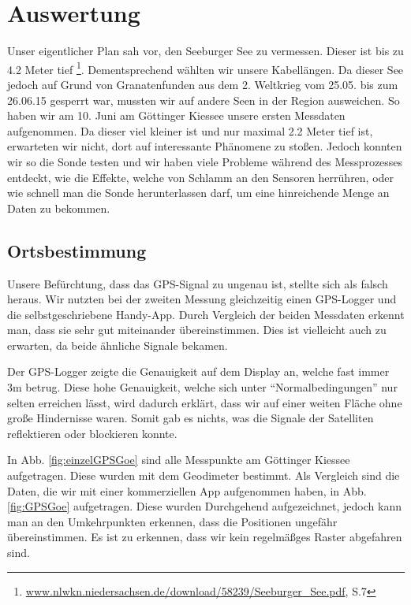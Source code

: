 \documentclass[12pt,a4paper,titlepage,headinclude,bibtotoc]{scrartcl}
\numberwithin{equation}{subsection}
\begin{document}
\section{Auswertung}
\label{sec:auswertung}

Unser eigentlicher Plan sah vor, den Seeburger See zu vermessen.
Dieser ist bis zu 4.2 Meter tief \footnote{\url{www.nlwkn.niedersachsen.de/download/58239/Seeburger\_See.pdf}, S.7}.
Dementsprechend wählten wir unsere Kabellängen.
Da dieser See jedoch auf Grund von Granatenfunden aus dem 2. Weltkrieg vom 25.05. bis zum 26.06.15 gesperrt war, mussten wir auf andere Seen in der Region ausweichen.
So haben wir am 10. Juni am Göttinger Kiessee unsere ersten Messdaten aufgenommen.
Da dieser viel kleiner ist und nur maximal 2.2 Meter tief ist, erwarteten wir nicht, dort auf interessante Phänomene zu stoßen.
Jedoch konnten wir so die Sonde testen und wir haben viele Probleme während des Messprozesses entdeckt, wie die Effekte, welche von Schlamm an den Sensoren herrühren, oder wie schnell man die Sonde herunterlassen darf, um eine hinreichende Menge an Daten zu bekommen.


\subsection{Ortsbestimmung}
\label{sec:ausort}
Unsere Befürchtung, dass das GPS-Signal zu ungenau ist, stellte sich als falsch heraus.
Wir nutzten bei der zweiten Messung gleichzeitig einen GPS-Logger und die selbstgeschriebene Handy-App.
Durch Vergleich der beiden Messdaten erkennt man, dass sie sehr gut miteinander übereinstimmen.
Dies ist vielleicht auch zu erwarten, da beide ähnliche Signale bekamen.

Der GPS-Logger zeigte die Genauigkeit auf dem Display an, welche fast immer 3m betrug.
Diese hohe Genauigkeit, welche sich unter "`Normalbedingungen"' nur selten erreichen lässt, wird dadurch erklärt, dass wir auf einer weiten Fläche ohne große Hindernisse waren.
Somit gab es nichts, was die Signale der Satelliten reflektieren oder blockieren konnte.


In Abb. \ref{fig:einzelGPSGoe} sind alle Messpunkte am Göttinger Kiessee aufgetragen.
Diese wurden mit dem Geodimeter bestimmt.
Als Vergleich sind die Daten, die wir mit einer kommerziellen App aufgenommen haben, in Abb. \ref{fig:GPSGoe} aufgetragen.
Diese wurden Durchgehend aufgezeichnet, jedoch kann man an den Umkehrpunkten erkennen, dass die Positionen ungefähr übereinstimmen.
Es ist zu erkennen, dass wir kein regelmäßges Raster abgefahren sind.
\end{document}
